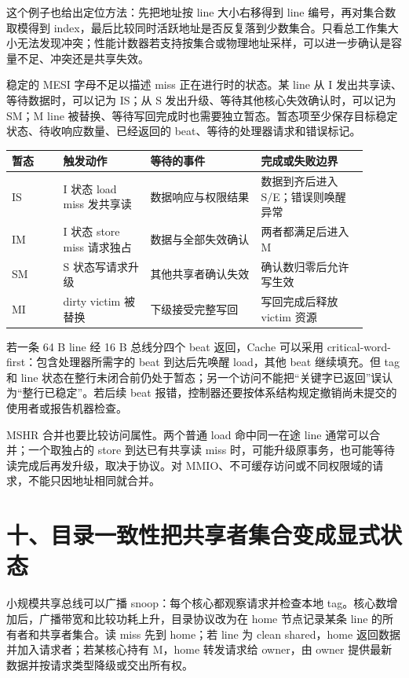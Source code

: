 这个例子也给出定位方法：先把地址按 line 大小右移得到 line 编号，再对集合数取模得到 index，最后比较同时活跃地址是否反复落到少数集合。只看总工作集大小无法发现冲突；性能计数器若支持按集合或物理地址采样，可以进一步确认是容量不足、冲突还是共享失效。


稳定的 MESI 字母不足以描述 miss 正在进行时的状态。某 line 从 I 发出共享读、等待数据时，可以记为 IS；从 S 发出升级、等待其他核心失效确认时，可以记为 SM；M line 被替换、等待写回完成时也需要独立暂态。暂态项至少保存目标稳定状态、待收响应数量、已经返回的 beat、等待的处理器请求和错误标记。

\begin{longtable}{L{0.13\linewidth}L{0.22\linewidth}L{0.28\linewidth}L{0.27\linewidth}}
\toprule
暂态 & 触发动作 & 等待的事件 & 完成或失败边界 \\
\midrule
IS & I 状态 load miss 发共享读 & 数据响应与权限结果 & 数据到齐后进入 S/E；错误则唤醒异常 \\\tablerowrule
IM & I 状态 store miss 请求独占 & 数据与全部失效确认 & 两者都满足后进入 M \\\tablerowrule
SM & S 状态写请求升级 & 其他共享者确认失效 & 确认数归零后允许写生效 \\\tablerowrule
MI & dirty victim 被替换 & 下级接受完整写回 & 写回完成后释放 victim 资源 \\
\bottomrule
\end{longtable}

若一条 64 B line 经 16 B 总线分四个 beat 返回，Cache 可以采用 critical-word-first：包含处理器所需字的 beat 到达后先唤醒 load，其他 beat 继续填充。但 tag 和 line 状态在整行未闭合前仍处于暂态；另一个访问不能把“关键字已返回”误认为“整行已稳定”。若后续 beat 报错，控制器还要按体系结构规定撤销尚未提交的使用者或报告机器检查。

MSHR 合并也要比较访问属性。两个普通 load 命中同一在途 line 通常可以合并；一个取独占的 store 到达已有共享读 miss 时，可能升级原事务，也可能等待读完成后再发升级，取决于协议。对 MMIO、不可缓存访问或不同权限域的请求，不能只因地址相同就合并。

\section{十、目录一致性把共享者集合变成显式状态}

小规模共享总线可以广播 snoop：每个核心都观察请求并检查本地 tag。核心数增加后，广播带宽和比较功耗上升，目录协议改为在 home 节点记录某条 line 的所有者和共享者集合。读 miss 先到 home；若 line 为 clean shared，home 返回数据并加入请求者；若某核心持有 M，home 转发请求给 owner，由 owner 提供最新数据并按请求类型降级或交出所有权。


